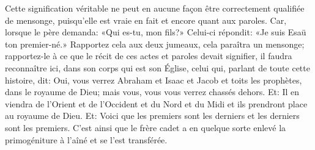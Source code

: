  Cette signification véritable
	ne peut en aucune façon être correctement qualifiée de mensonge,
	puisqu’elle est vraie en fait et encore quant aux paroles.
Car, lorsque le père demanda: «Qui es-tu, mon fils?»
	Celui-ci répondit: «Je suis Esaü ton premier-né.»
Rapportez cela aux deux jumeaux, cela paraîtra un mensonge;
	rapportez-le à ce que le récit de ces actes et paroles devait signifier,
	il faudra reconnaître ici, dans son corps qui est son Église,
	celui qui, parlant de toute cette histoire, dit:
	Oui, vous verrez Abraham et Isaac et Jacob et toits les prophètes,
		dans le royaume de Dieu;
	mais vous, vous vous verrez chassés dehors.
Et: Il en viendra de l’Orient et de l’Occident et du Nord et du Midi
	et ils prendront place au royaume de Dieu.
Et: Voici que les premiers sont les derniers et les derniers sont les premiers.
C’est ainsi que le frère cadet
	a en quelque sorte enlevé la primogéniture à l’aîné
	et se l’est transférée.
